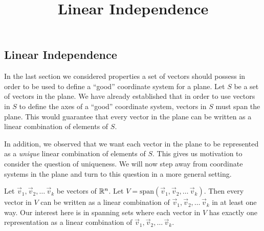 \documentclass{ximera}
\title{Linear Independence} \license{CC BY-NC-SA 4.0}
\begin{document}
\begin{abstract}
 \end{abstract}
\maketitle

\begin{onlineOnly}
\section*{Linear Independence}
\end{onlineOnly}





In the last section  we considered properties a set of vectors should possess in order to be used to define a ``good'' coordinate system for a plane.  Let $S$ be a set of vectors in the plane.  We have already established that in order to use vectors in $S$ to define the axes of a ``good'' coordinate system, vectors in $S$ must span the plane.  This would guarantee that every vector in the plane can be written as a linear combination of elements of $S$.  

In addition, we observed that we want each vector in the plane to be represented as a \textit{unique} linear combination of elements of $S$.  This gives us motivation to consider the question of uniqueness.  We will now step away from coordinate systems in the plane and turn to this question in a more general setting.

Let $\vec{v}_1, \vec{v}_2,\dots\,\vec{v}_k$ be vectors of $\mathbb{R}^n$.  Let $V=\text{span}(\vec{v}_1, \vec{v}_2,\dots\,\vec{v}_k)$.  Then every vector in $V$ can be written as a linear combination of $\vec{v}_1, \vec{v}_2,\dots\,\vec{v}_k$ in at least one way.  Our interest here is in spanning sets where each vector in $V$ has exactly one representation as a linear combination of $\vec{v}_1, \vec{v}_2,\dots\,\vec{v}_k$.
\end{document}
